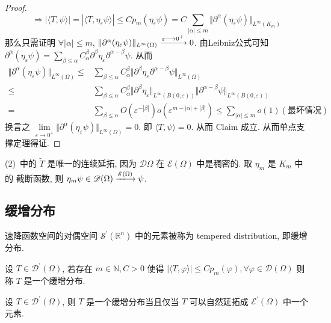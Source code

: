 \documentclass[11pt]{ctexart}[UTF8]
\begin{document}
\begin{proof}
\begin{equation*}
        \Longrightarrow \left| \langle T, \psi \rangle \right| = \left| \langle T, \eta_{\varepsilon}\psi \rangle \right| \leq C p_{m}(\eta_{\varepsilon} \psi) = C \sum\limits_{|\alpha| \leq m} \Vert \partial^{\alpha} (\eta_{\varepsilon} \psi) \Vert_{L^{\infty}(K_{m})}
    \end{equation*}
    那么只需证明 $\forall |\alpha| \leq m$, $\Vert \partial^{\alpha} (\eta_{\varepsilon} \psi) \Vert_{L^{\infty}(\Omega)} \xlongrightarrow{\varepsilon \longrightarrow 0^+}0$.
    由Leibniz公式可知 $\partial^{\alpha} (\eta_{\varepsilon} \psi) = \sum\limits_{\beta \leq \alpha} C_{\alpha}^{\beta} \partial^{\beta} \eta_{\varepsilon} \partial^{\alpha - \beta} \psi$. 从而
    \begin{equation*}
        \begin{aligned}
            \Vert \partial^{\alpha} (\eta_{\varepsilon} \psi) \Vert_{L^{\infty}(\Omega)} \leq & \sum\limits_{\beta \leq \alpha} C_{\alpha}^{\beta} \Vert \partial^{\beta} \eta_{\varepsilon} \partial^{\alpha - \beta} \psi \Vert_{L^{\infty}(\Omega)} \\
            \leq & \sum\limits_{\beta \leq \alpha} C_{\alpha}^{\beta} \Vert \partial^{\beta} \eta_{\varepsilon} \Vert_{L^{\infty}(B(0,\varepsilon))} \Vert \partial^{\alpha - \beta} \psi \Vert_{L^{\infty}(B(0,\varepsilon))} \\
            = & \sum\limits_{\beta \leq \alpha} O(\varepsilon^{-|\beta|}) o(\varepsilon^{m-|\alpha|+|\beta|}) \leq \sum\limits_{|\alpha|\leq m} o(1) (\text{最坏情况})
        \end{aligned}
    \end{equation*}
    换言之 $\lim\limits_{\varepsilon \to 0^+} \Vert \partial^{\alpha} (\eta_{\varepsilon} \psi) \Vert_{L^{\infty}(\Omega)} = 0$.
    即 $\langle T, \psi \rangle = 0$. 从而 $\mathrm{Claim}$ 成立. 从而单点支撑定理得证.
    \end{proof}
    \begin{remark}
        (2)\ 中的 $\widetilde{T}$ 是唯一的连续延拓, 因为 $\mathscr{D}\Omega$ 在 $\mathscr{E}(\Omega)$ 中是稠密的. 取 $\eta_{m}$ 是 $K_{m}$ 中的
        截断函数, 则 $\eta_{m}\psi \in \mathscr{D}(\Omega) \xlongrightarrow{\mathscr{E}(\Omega)} \psi$. 
    \end{remark}
\subsection{缓增分布}
速降函数空间的对偶空间 $\mathscr{S}^{\prime}(\mathbb{R}^{n})$ 中的元素被称为 tempered distribution, 即缓增分布.
\begin{definition}
    设 $T \in \mathscr{D}^{\prime}(\Omega)$, 若存在 $m \in \mathbb{N}, C>0$ 使得 $\left| \langle T, \varphi \rangle \right| \leq C p_{m}(\varphi), \forall \varphi \in \mathscr{D}(\Omega)$ 则称 $T$ 是一个缓增分布.
\end{definition}
\begin{remark}
    设 $T \in \mathscr{D}^{\prime}(\Omega)$, 则 $T$ 是一个缓增分布当且仅当 $T$ 可以自然延拓成 $\mathscr{E}^{\prime}(\Omega)$ 中一个元素.
\end{remark}
\newpage
\end{document}

